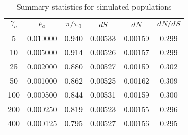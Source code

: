 
\begin{table}
\label{tab:summaryStats}
   \centering
   \begin{threeparttable}[b]
\caption{Summary statistics for simulated populations}

\begin{tabular}{cccccc}
\toprule
 $\gamma_a$ &       $p_a$ &   $\pi / \pi_0$ &        $dS$ &        $dN$ &     $dN/dS$ \\
\midrule
       5 &  0.010000 &  0.940 &  0.00533 &  0.00159 &  0.299 \\
      10 &  0.005000 &  0.914 &  0.00526 &  0.00157 &  0.299 \\
      25 &  0.002000 &  0.880 &  0.00527 &  0.00159 &  0.302 \\
      50 &  0.001000 &  0.862 &  0.00525 &  0.00162 &  0.309 \\
     100 &  0.000500 &  0.844 &  0.00531 &  0.00159 &  0.300 \\
     200 &  0.000250 &  0.819 &  0.00523 &  0.00155 &  0.296 \\
     400 &  0.000125 &  0.795 &  0.00527 &  0.00156 &  0.295 \\
\bottomrule
\end{tabular}

   \end{threeparttable}

   \end{table}
